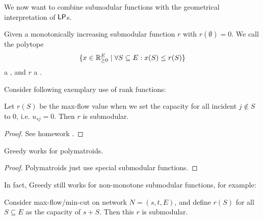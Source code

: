 
We now want to combine submodular functions with the geometrical interpretation of $\mathsf{LP}$s.
\begin{definition}[Polymatroid]
    Given a monotonically increasing submodular function $r$ with $r(\emptyset) = 0$. We call the polytope
    \begin{align*}
        \{x \in \realnum^E_{\geq 0} \mid \forall S \subset E: x(S) \leq r(S)\}
    \end{align*}
    a , and $r$ a .
\end{definition}
Consider following exemplary use of rank functions:
\begin{theorem}
    Let $r(S)$ be the max-flow value when we set the capacity for all incident $j \not \in S$ to $0$, i.e. $u_{sj}=0$.
    Then $r$ is submodular.
\end{theorem}
\begin{proof}
    See homework .
\end{proof}
\begin{theorem}
    Greedy works for polymatroids.
\end{theorem}
\begin{proof}
    Polymatroids just use special submodular functions.
\end{proof}
In fact, Greedy still works for non-monotone submodular functions, for example:
\begin{theorem}
    Consider max-flow/min-cut on network $N =(s,t,E)$, and define $r(S)$ for all $S \subseteq E$
    as the capacity of $s+S$. Then this $r$ is submodular.
\end{theorem}
